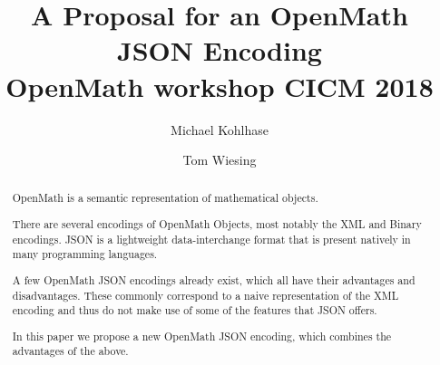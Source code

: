 \documentclass[12pt]{article}
\title{A Proposal for an OpenMath JSON Encoding\\OpenMath workshop CICM 2018}
\author{Michael Kohlhase \and Tom Wiesing}
\begin{document}
    \maketitle

    \begin{abstract}
        OpenMath is a semantic representation of mathematical objects. 

        There are several encodings of OpenMath Objects, most notably the XML and Binary encodings. 
        JSON is a lightweight data-interchange format that is present natively in many programming languages. 
        
        A few OpenMath JSON encodings already exist, which all have their advantages and disadvantages. 
        These commonly correspond to a naive representation of the XML encoding and thus do not make use of some of the features that JSON offers. 
        
        In this paper we propose a new OpenMath JSON encoding, which combines the advantages of the above. 
    \end{abstract}


    
    
    

    \printbibliography
\end{document}
